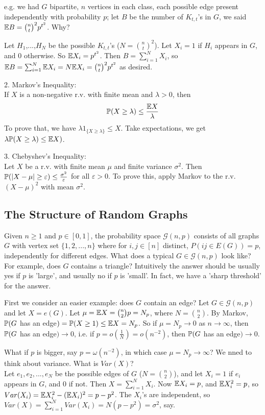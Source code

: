 \documentclass[a4paper]{article}
\begin{document}
e.g. we had $G$ bipartite, $n$ vertices in each class, each possible edge present independently with probability $p$; let $B$ be the number of $K_{t,t}$'s in $G$, we said $\E B = {n \choose t}^2 p^{t^2}$. Why?

Let $H_1$,...,$H_N$ be the possible $K_{t,t}$'s ($N={n \choose t}^2$). Let $X_i=1$ if $H_i$ appears in $G$, and $0$ otherwise. So $\E X_i = p^{t^2}$. Then $B = \sum_{i=1}^N X_i$, so $\E B = \sum_{i=1}^N \E X_i = N \E X_i = {n \choose t}^2 p^{t^2}$ as desired.

2. Markov's Inequality:\\
If $X$ is a non-negative r.v. with finite mean and $\lambda>0$, then $$\P(X \geq \lambda) \leq \frac{\E X}{\lambda}$$ To prove that, we have $\lambda 1_{\{X\geq \lambda\} } \leq X$. Take expectations, we get $\lambda \P(X \geq \lambda) \leq \E X)$.

3. Chebyshev's Inequality:\\
Let $X$ be a r.v. with finite mean $\mu$ and finite variance $\sigma^2$. Then $\P(|X-\mu| \geq \varepsilon) \leq \frac{\sigma^2}{\varepsilon}$ for all $\varepsilon > 0$. To prove this, apply Markov to the r.v. $(X-\mu)^2$ with mean $\sigma^2$.

\subsection{The Structure of Random Graphs}
Given $n \geq 1$ and $p \in [0,1]$, the probability space $\mathcal{G}(n,p)$ consists of all graphs $G$ with vertex set $\{1,2,...,n\}$ where for $i,j \in [n]$ distinct, $P(ij \in E(G)) = p$, independently for different edges. What does a typical $G \in \mathcal{G}(n,p)$ look like? For example, does $G$ contains a triangle? Intuitively the answer should be usually yes if $p$ is 'large', and usually no if $p$ is 'small'. In fact, we have a 'sharp threshold' for the answer.

First we consider an easier example: does $G$ contain an edge? Let $G \in \mathcal{G}(n,p)$ and let $X = e(G)$. Let $\mu = \E X = {n \choose 2} p = N_p$, where $N = {n \choose 2}$. By Markov, $\P(G$ has an edge$) = \P(X \geq 1) \leq \E X = N_p$. So if $\mu = N_p \to 0$ as $n \to \infty$, then $\P(G$ has an edge$) \to 0$, i.e. if $p = o(\frac{1}{N}) = o(n^{-2})$, then $\P(G$ has an edge$) \to 0$.

What if $p$ is bigger, say $p = \omega(n^{-2})$, in which case $\mu = N_p \to \infty$? We nned to think about variance. What is $Var(X)$?\\
Let $e_1,e_2,...,e_N$ be the possible edges of $G$ ($N = {n \choose 2}$), and let $X_i = 1$ if $e_i$ appears in $G$, and $0$ if not. Then $X = \sum_{i=1}^N X_i$. Now $\E X_i = p$, and $\E X_i^2 = p$, so $Var(X_i) = \E X_i^2 - (\E X_i)^2 = p-p^2$. The $X_i$'s are independent, so $Var(X) = \sum_{i=1}^N Var(X_i) = N(p-p^2) = \sigma^2$, say.
\end{document}

